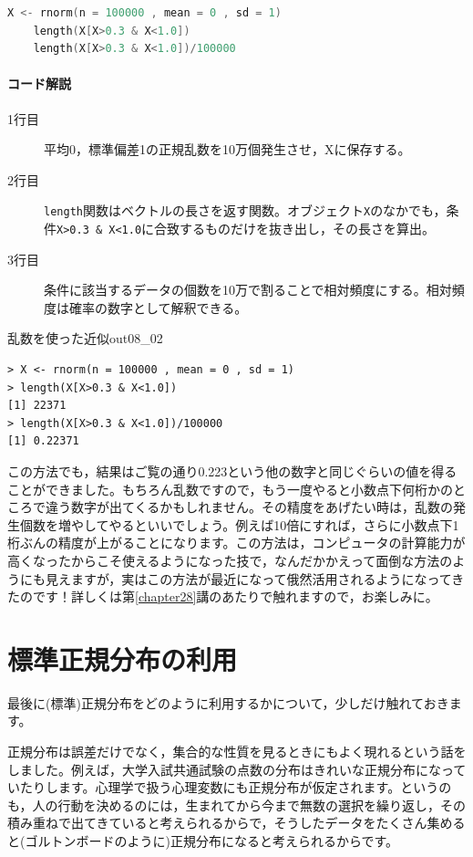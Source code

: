 \documentclass{ltjbook}
\begin{document}
\begin{lstlisting}[language=c++,label={code::08_02},caption={乱数を使った近似}]
    X <- rnorm(n = 100000 , mean = 0 , sd = 1)
    length(X[X>0.3 & X<1.0])
    length(X[X>0.3 & X<1.0])/100000
\end{lstlisting}
\paragraph{コード解説}
\begin{description}
    \item[1行目] 平均0，標準偏差1の正規乱数を10万個発生させ，Xに保存する。
    \item[2行目] \texttt{length}関数はベクトルの長さを返す関数。オブジェクト\texttt{X}のなかでも，条件\verb|X>0.3 & X<1.0|に合致するものだけを抜き出し，その長さを算出。
    \item[3行目] 条件に該当するデータの個数を10万で割ることで相対頻度にする。相対頻度は確率の数字として解釈できる。
\end{description}

\begin{Rscreen}{乱数を使った近似}{out08_02}
\begin{verbatim}
> X <- rnorm(n = 100000 , mean = 0 , sd = 1)
> length(X[X>0.3 & X<1.0])
[1] 22371
> length(X[X>0.3 & X<1.0])/100000
[1] 0.22371
\end{verbatim}
\end{Rscreen}
この方法でも，結果はご覧の通り0.223という他の数字と同じぐらいの値を得ることができました。もちろん乱数ですので，もう一度やると小数点下何桁かのところで違う数字が出てくるかもしれません。その精度をあげたい時は，乱数の発生個数を増やしてやるといいでしょう。例えば10倍にすれば，さらに小数点下1桁ぶんの精度が上がることになります。この方法は，コンピュータの計算能力が高くなったからこそ使えるようになった技で，なんだかかえって面倒な方法のようにも見えますが，実はこの方法が最近になって俄然活用されるようになってきたのです！詳しくは第\ref{chapter28}講のあたりで触れますので，お楽しみに。

\section{標準正規分布の利用}
\label{UsefulNormal}
最後に(標準)正規分布をどのように利用するかについて，少しだけ触れておきます。

正規分布は誤差だけでなく，集合的な性質を見るときにもよく現れるという話をしました。例えば，大学入試共通試験の点数の分布はきれいな正規分布になっていたりします。心理学で扱う心理変数にも正規分布が仮定されます。というのも，人の行動を決めるのには，生まれてから今まで無数の選択を繰り返し，その積み重ねで出てきていると考えられるからで，そうしたデータをたくさん集めると(ゴルトンボードのように)正規分布になると考えられるからです。
\end{document}
